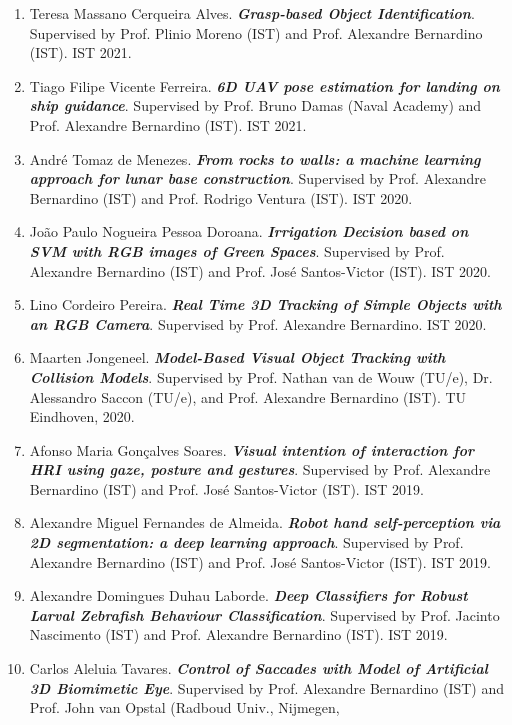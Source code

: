\begin{enumerate}
  by Prof. Catarina Barata (IST) and Prof. Alexandre Bernardino (IST).
  IST 2021.
\item
  Teresa Massano Cerqueira Alves. \emph{\textbf{Grasp-based Object
  Identification}}. Supervised by Prof. Plinio Moreno (IST) and Prof.
  Alexandre Bernardino (IST). IST 2021.
\item
  Tiago Filipe Vicente Ferreira. \emph{\textbf{6D UAV pose estimation
  for landing on ship guidance}}. Supervised by Prof. Bruno Damas (Naval
  Academy) and Prof. Alexandre Bernardino (IST). IST 2021.
\item
  André Tomaz de Menezes. \emph{\textbf{From rocks to walls: a machine
  learning approach for lunar base construction}}. Supervised by Prof.
  Alexandre Bernardino (IST) and Prof. Rodrigo Ventura (IST). IST 2020.
\item
  João Paulo Nogueira Pessoa Doroana. \emph{\textbf{Irrigation Decision
  based on SVM with RGB images of Green Spaces}}. Supervised by Prof.
  Alexandre Bernardino (IST) and Prof. José Santos-Victor (IST). IST
  2020.
\item
  Lino Cordeiro Pereira. \emph{\textbf{Real Time 3D Tracking of Simple
  Objects with an RGB Camera}}. Supervised by Prof. Alexandre
  Bernardino. IST 2020.
\item
  Maarten Jongeneel. \emph{\textbf{Model-Based Visual Object Tracking
  with Collision Models}}. Supervised by Prof. Nathan van de Wouw
  (TU/e), Dr. Alessandro Saccon (TU/e), and Prof. Alexandre Bernardino
  (IST). TU Eindhoven, 2020.
\item
  Afonso Maria Gonçalves Soares. \emph{\textbf{Visual intention of
  interaction for HRI using gaze, posture and gestures}}. Supervised by
  Prof. Alexandre Bernardino (IST) and Prof. José Santos-Victor (IST).
  IST 2019.
\item
  Alexandre Miguel Fernandes de Almeida. \emph{\textbf{Robot hand
  self-perception via 2D segmentation: a deep learning approach}}.
  Supervised by Prof. Alexandre Bernardino (IST) and Prof. José
  Santos-Victor (IST). IST 2019.
\item
  Alexandre Domingues Duhau Laborde. \emph{\textbf{Deep Classifiers for
  Robust Larval Zebrafish Behaviour Classification}}. Supervised by
  Prof. Jacinto Nascimento (IST) and Prof. Alexandre Bernardino (IST).
  IST 2019.
\item
  Carlos Aleluia Tavares. \emph{\textbf{Control of Saccades with Model
  of Artificial 3D Biomimetic Eye}}. Supervised by Prof. Alexandre
  Bernardino (IST) and Prof. John van Opstal (Radboud Univ., Nijmegen,

\end{enumerate}
